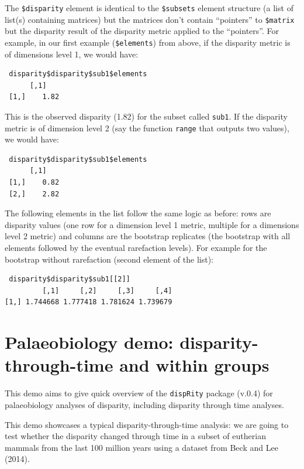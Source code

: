 \documentclass[]{book}
\theoremstyle{definition}
\theoremstyle{definition}
\theoremstyle{remark}
\begin{document}
The \texttt{\$disparity} element is identical to the \texttt{\$subsets}
element structure (a list of list(s) containing matrices) but the
matrices don't contain ``pointers'' to \texttt{\$matrix} but the
disparity result of the disparity metric applied to the ``pointers''.
For example, in our first example (\texttt{\$elements}) from above, if
the disparity metric is of dimensions level 1, we would have:

\begin{verbatim}
 disparity$disparity$sub1$elements
      [,1]
 [1,]    1.82
\end{verbatim}

This is the observed disparity (1.82) for the subset called
\texttt{sub1}. If the disparity metric is of dimension level 2 (say the
function \texttt{range} that outputs two values), we would have:

\begin{verbatim}
 disparity$disparity$sub1$elements
      [,1]
 [1,]    0.82
 [2,]    2.82
\end{verbatim}

The following elements in the list follow the same logic as before: rows
are disparity values (one row for a dimension level 1 metric, multiple
for a dimensions level 2 metric) and columns are the bootstrap
replicates (the bootstrap with all elements followed by the eventual
rarefaction levels). For example for the bootstrap without rarefaction
(second element of the list):

\begin{verbatim}
 disparity$disparity$sub1[[2]]
         [,1]     [,2]     [,3]     [,4]
[1,] 1.744668 1.777418 1.781624 1.739679 
\end{verbatim}

\chapter{Palaeobiology demo: disparity-through-time and within
groups}\label{palaeobiology-demo-disparity-through-time-and-within-groups}

This demo aims to give quick overview of the \texttt{dispRity} package
(v.0.4) for palaeobiology analyses of disparity, including disparity
through time analyses.

This demo showcases a typical disparity-through-time analysis: we are
going to test whether the disparity changed through time in a subset of
eutherian mammals from the last 100 million years using a dataset from
Beck and Lee (2014).
\end{document}
